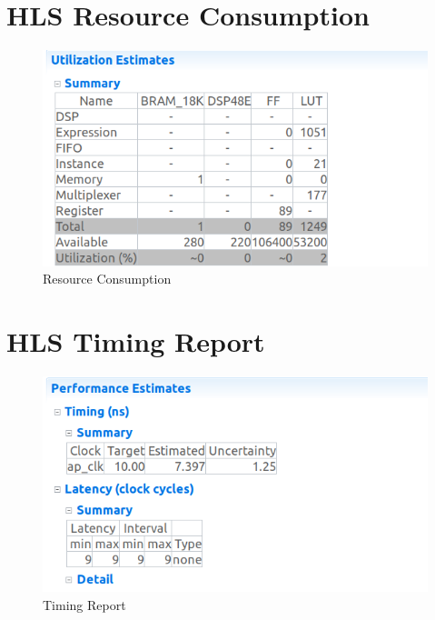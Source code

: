 \documentclass{article}
\begin{document}
\section{HLS Resource Consumption}
\vspace{3cm}
\begin{figure}[h]
    \centering
\includegraphics[width=\columnwidth]{1.png}
    \caption{Resource Consumption}
    \label{fig:my_label}
\end{figure}

\vspace{5cm}


\section{HLS Timing Report}
\vspace{1cm}
\begin{figure}[h]
    \centering
\includegraphics[width=\columnwidth]{figs/2.png}
    \caption{Timing Report}
    \label{fig:my_label}
\end{figure}

\vspace{10cm}
\end{document}
